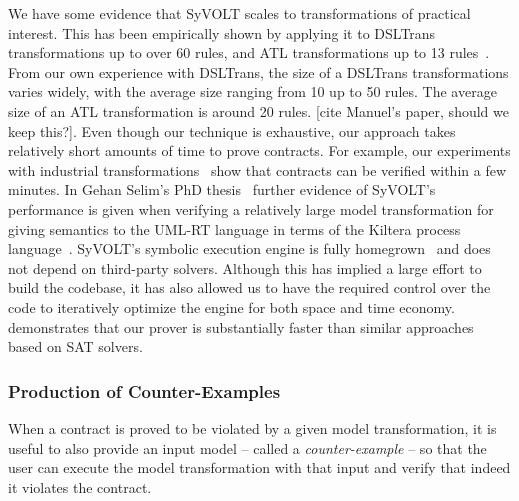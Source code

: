 We have some evidence that SyVOLT scales to transformations of practical
interest. This has been empirically shown by applying it to DSLTrans
transformations up to over 60 rules, and ATL transformations up to 13
rules~\cite{Oakes}. From our own experience with DSLTrans, the size of a
DSLTrans transformations varies widely, with the average size ranging from 10 up
to 50 rules. The average size of an ATL transformation is around 20 rules. [cite
Manuel's paper, should we keep this?]. Even though our technique is exhaustive, our
approach takes relatively short amounts of time to prove contracts. For example,
our experiments with industrial transformations~\cite{Oakes} show that contracts
can be verified within a few minutes. In Gehan Selim's PhD
thesis~\cite{Selim2015} further evidence of SyVOLT's performance is given when
verifying a relatively large model transformation for giving semantics to the
UML-RT language in terms of the Kiltera process language~\cite{PosseDingel2014}.
SyVOLT's symbolic execution engine is fully
homegrown~\cite{LucioVang} and does not depend on third-party solvers. Although this has implied
a large effort to build the codebase, it has also allowed us to have the
required control over the code to iteratively optimize the engine for both space
and time economy.
\cite{Selim2014} demonstrates that our prover is substantially faster than
similar approaches based on SAT solvers.


\subsubsection{Production of Counter-Examples}

When a contract is proved to be violated by a given model transformation, it is
useful to also provide an input model -- called a \emph{counter-example} -- so
that the user can execute the model transformation with that input and verify
that indeed it violates the contract.

